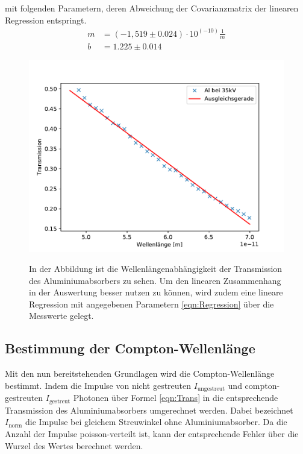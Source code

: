 \documentclass[titlepage = firstcover]{scrartcl}
\begin{document}
        \noindent
        mit folgenden Parametern, deren Abweichung der Covarianzmatrix der linearen Regression entspringt.
        \begin{align}
            m &= (-1,519 \pm 0.024) \cdot 10^{(-10)} \frac{1}{m} \\
            b &= 1.225 \pm 0.014
            \label{eqn:Parameter}
        \end{align}
        \FloatBarrier
        \begin{figure}[h]
            \centering
            \caption{In der Abbildung ist die Wellenlängenabhängigkeit der Transmission des Aluminiumabsorbers zu sehen. Um den linearen Zusammenhang in der Auswertung besser nutzen zu können, wird zudem eine lineare Regression mit angegebenen Parametern \ref{eqn:Regression} über die Messwerte gelegt.}
            \includegraphics[width = 0.9\linewidth]{Compton_Alu.pdf}
            \label{fig:Transmission}
        \end{figure}
        \FloatBarrier

        \subsection{Bestimmung der Compton-Wellenlänge}
        Mit den nun bereitstehenden Grundlagen wird die Compton-Wellenlänge bestimmt. Indem die Impulse von nicht gestreuten $I_{\text{ungestreut}}$ 
        und compton-gestreuten $I_{\text{gestreut}}$ Photonen über Formel \ref{eqn:Trans} in die entsprechende Transmission des Aluminiumabsorbers umgerechnet
        werden. Dabei bezeichnet $I_{\text{norm}}$ die Impulse bei gleichem Streuwinkel ohne Aluminiumabsorber. Da die Anzahl der Impulse poisson-verteilt 
        ist, kann der entsprechende Fehler über die Wurzel des Wertes berechnet werden.
\end{document}
